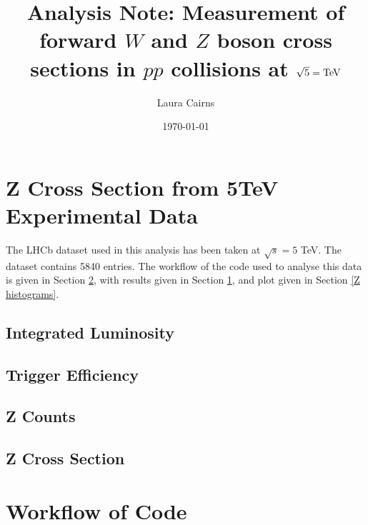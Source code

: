 \documentclass[a4paper]{article}
\title{Analysis Note: Measurement of forward $W$ and $Z$ boson cross sections in $pp$ collisions at $\sqrt{5}=\rm{TeV}$}
\author{Laura Cairns}
\date{\today}
\begin{document}
\maketitle


\section{Z Cross Section from 5TeV Experimental Data} \label{results}

The LHCb dataset used in this analysis has been taken at $\sqrt{s} = 5$ TeV. The dataset contains 5840 entries. The workflow of the code used to analyse this data is given in Section \ref{workflow}, with results given in Section \ref{results}, and plot given in Section \ref{Z histograms}.

\subsection{Integrated Luminosity} \label{lumi_val}


\subsection{Trigger Efficiency} \label{trigger_val}


\subsection{Z Counts} \label{counts_val}


\subsection{Z Cross Section} \label{xsec_val}



\section{Workflow of Code} \label{workflow}
\end{document}
